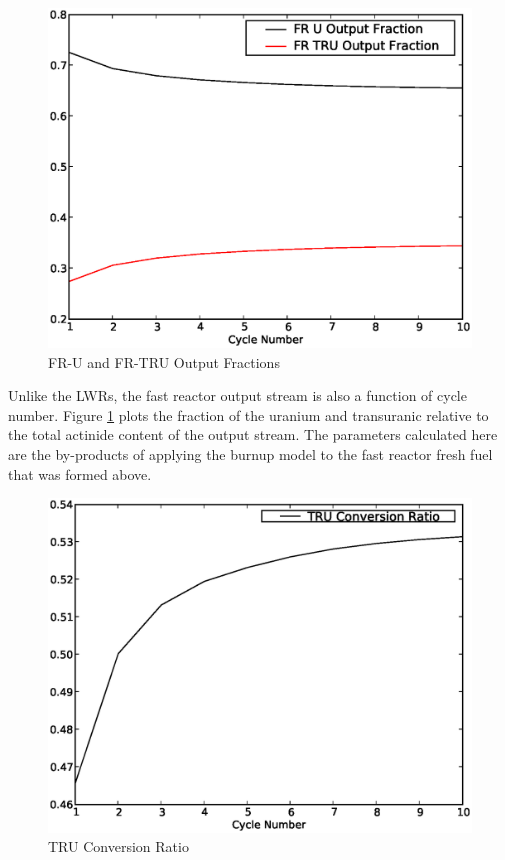 \begin{figure}[htbp]
\caption{FR-U and FR-TRU Output Fractions}
\label{1g_fig19}
\begin{center}
\includegraphics[scale=0.5]{one_group_method/figs/Fig19.eps}
\end{center}
\end{figure}

Unlike the LWRs, the fast reactor output stream is also a function of cycle number.  
Figure \ref{1g_fig19} plots the fraction of the uranium and transuranic relative to 
the total actinide content of the output stream.   The parameters calculated here are 
the by-products of applying the burnup model to the fast reactor fresh fuel that was formed above.

\begin{figure}[htbp]
\caption{TRU Conversion Ratio}
\label{1g_fig20}
\begin{center}
\includegraphics[scale=0.5]{one_group_method/figs/Fig20.eps}
\end{center}
\end{figure}

